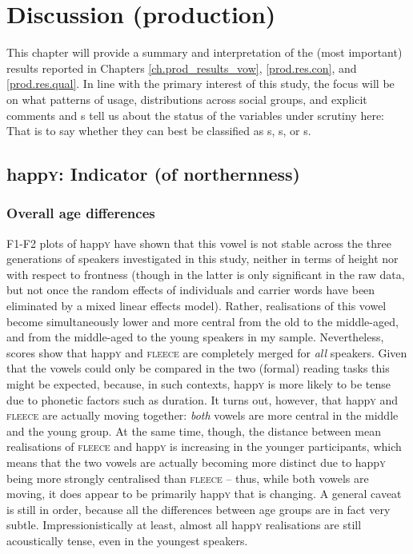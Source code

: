 \chapter{Discussion (production)}
\label{ch.prod_discussion}

This chapter will provide a summary and interpretation of the (most important) results reported in Chapters \ref{ch.prod_results_vow}, \ref{prod.res.con}, and \ref{prod.res.qual}.
In line with the primary interest of this study, the focus will be on what patterns of usage, distributions across social groups, and explicit comments and s tell us about the status of the variables under scrutiny here: That is to say whether they can best be classified as s, s, or s.

\section{happ\textsc{y}: Indicator (of northernness)}
\label{prod.disc.happy}

\subsection{Overall age differences}
\label{prod.disc.happy.age}

F1-F2 plots of happ\textsc{y} have shown that this vowel is not stable across the three generations of speakers investigated in this study, neither in terms of height nor with respect to frontness (though  in the latter is only significant in the raw data, but not once the random effects of individuals and carrier words have been eliminated by a mixed linear effects model).
Rather, realisations of this vowel become simultaneously lower and more central from the old to the middle-aged, and from the middle-aged to the young speakers in my sample.
Nevertheless,  scores show that happ\textsc{y} and \textsc{fleece} are completely merged for \emph{all} speakers.
Given that the vowels could only be compared in the two (formal) reading tasks this might be expected, because, in such contexts, happ\textsc{y} is more likely to be tense due to phonetic factors such as duration.
It turns out, however, that happ\textsc{y} and \textsc{fleece} are actually moving together: \emph{both} vowels are more central in the middle and the young group.
At the same time, though, the distance between mean realisations of \textsc{fleece} and happ\textsc{y} is increasing in the younger participants, which means that the two vowels are actually becoming more distinct due to happ\textsc{y} being more strongly centralised than \textsc{fleece} -- thus, while both vowels are moving, it does appear to be primarily happ\textsc{y} that is changing.
A general caveat is still in order, because all the differences between age groups are in fact very subtle.
Impressionistically at least, almost all happ\textsc{y} realisations are still acoustically tense, even in the youngest speakers.

